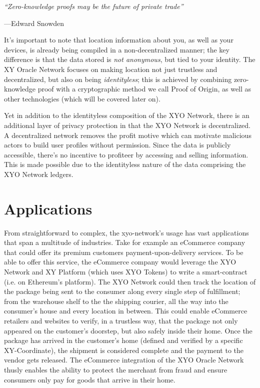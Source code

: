 \documentclass{article}
\begin{document}
\begin{displayquote}\textit{``Zero-knowledge proofs may be the future of private trade''}

\vspace{2mm}
---Edward Snowden
\end{displayquote}

It's important to note that location information about you, as well as your devices, is already being compiled in a non-decentralized manner; the key difference is that the data stored is \textit{not anonymous}, but tied to your identity. The XY Oracle Network focuses on making location not just trustless and decentralized, but also on being \textit{identityless}; this is achieved by combining zero-knowledge proof with a cryptographic method we call Proof of Origin, as well as other technologies (which will be covered later on).

Yet in addition to the identityless composition of the XYO Network, there is an additional layer of privacy protection in that the XYO Network is decentralized. A decentralized network removes the profit motive which can motivate malicious actors to build user profiles without permission. Since the data is publicly accessible, there's no incentive to profiteer by accessing and selling information. This is made possible due to the identityless nature of the data comprising the XYO Network ledgers.

\section{Applications}

From straightforward to complex, the \Gls{xyo-network}'s usage  has vast applications that span a multitude of industries. Take for example an eCommerce company that could offer its premium customers payment-upon-delivery services. To be able to offer this service, the eCommerce company would leverage the XYO Network and XY Platform (which uses XYO Tokens) to write a \gls{smart-contract} (i.e. on Ethereum's platform). The XYO Network could then track the location of the package being sent to the consumer along every single step of fulfillment; from the warehouse shelf to the the shipping courier, all the way into the consumer's house and every location in between. This could enable eCommerce retailers and websites to verify, in a trustless way, that the package not only appeared on the customer's doorstep, but also safely inside their home. Once the package has arrived in the customer's home (defined and verified by a specific XY-Coordinate), the shipment is considered complete and the payment to the vendor gets released. The eCommerce integration of the XYO Oracle Network thusly enables the ability to protect the merchant from fraud and ensure consumers only pay for goods that arrive in their home.
\end{document}
